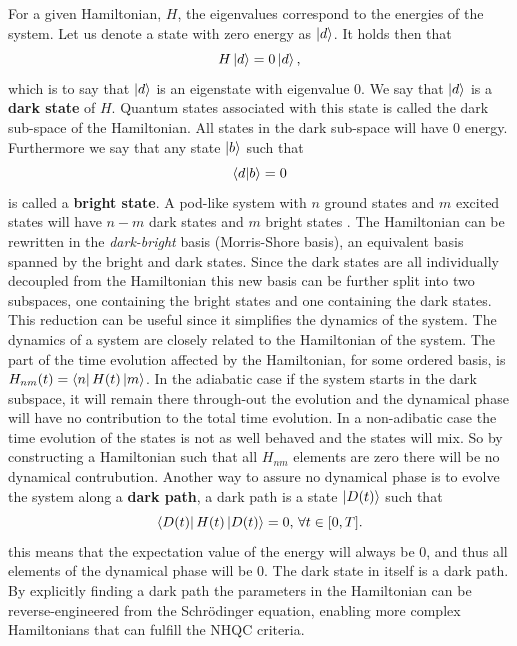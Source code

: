 For a given Hamiltonian, $H$, the eigenvalues correspond to the energies of the system. Let us denote a state with zero energy as $\ket{d}$. It holds then that
\begin{equation}
H\ket{d} = 0\ket{d},
\end{equation}
which is to say that $\ket{d}$ is an eigenstate with eigenvalue $0$. We say that $\ket{d}$ is a \textbf{dark state} of $H$. Quantum states associated with this state is called the dark sub-space of the Hamiltonian. All states in the dark sub-space will have $0$ energy. Furthermore we say that any state $\ket{b}$ such that 
\begin{equation}
\bra{d}\ket{b} = 0
\end{equation}
is called a \textbf{bright state}. A pod-like system with $n$ ground states and $m$ excited states will have $n-m$ dark states and $m$ bright states \cite{lambda}.
The Hamiltonian can be rewritten in the \textit{dark-bright} basis (Morris-Shore basis), an equivalent basis spanned by the bright and dark states. Since the dark states are all individually decoupled from the Hamiltonian this new basis can be further split into two subspaces, one containing the bright states and one containing the dark states. This reduction can be useful since it simplifies the dynamics of the system. 
The dynamics of a system are closely related to the Hamiltonian of the system. The part of the time evolution affected by the Hamiltonian, for some ordered basis, is $H_{nm}(t) = \bra{n}H(t)\ket{m}$. In the adiabatic case if the system starts in the dark subspace, it will remain there through-out the evolution and the dynamical phase will have no contribution to the total time evolution. In a non-adibatic case the time evolution of the states is not as well behaved and the states will mix. So by constructing a Hamiltonian such that all $H_{nm}$ elements are zero there will be no dynamical contrubution. Another way to assure no dynamical phase is to evolve the system along a \textbf{dark path}, a dark path is a state $\ket{D(t)}$ such that 
\begin{equation}
\bra{D(t)}H(t)\ket{D(t)} = 0, \, \forall t\in[0,T].
\end{equation}
this means that the expectation value of the energy will always be $0$, and thus all elements of the dynamical phase will be $0$. The dark state in itself is a dark path. By explicitly finding a dark path the parameters in the Hamiltonian can be reverse-engineered from the Schrödinger equation, enabling more complex Hamiltonians that can fulfill the NHQC criteria.


